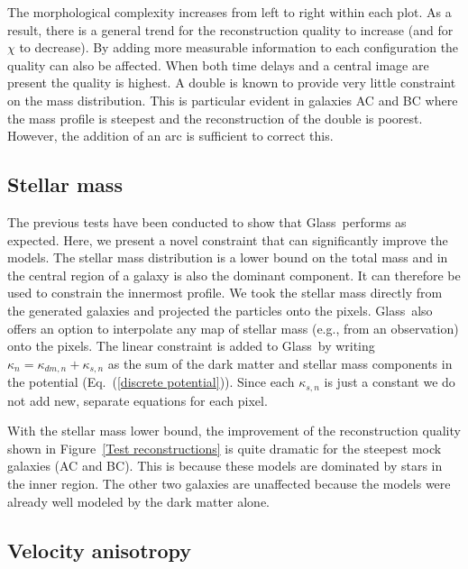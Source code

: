 \documentclass[onecolumn,galley]{mn2e}
\newcommand{\Glass}{{\sc Glass}}
\newcommand{\figref}[1] {Figure~\ref{#1}}
\newcommand{\eqnref}[1] {Eq.~(\ref{#1})}
\begin{document}
The morphological complexity increases from left to right within each plot. As
a result, there is a general trend for the reconstruction quality to increase
(and for $\chi$ to decrease). By adding more measurable information to each
configuration the quality can also be affected. When both time delays and a
central image are present the quality is highest. A double is known to provide
very little constraint on the mass distribution. This is particular evident in
galaxies AC and BC where the mass profile is steepest and the reconstruction of
the double is poorest. However, the addition of an arc is sufficient to correct
this.

\subsection{Stellar mass}

The previous tests have been conducted to show that \Glass\ performs as expected.
Here, we present a novel constraint that can significantly improve the models. 
The stellar mass distribution is a lower bound on the total mass and in the
central region of a galaxy is also the dominant component. It can therefore be
used to constrain the innermost profile. We took the stellar mass directly from
the generated galaxies and projected the particles onto the pixels. \Glass\
also offers an option to interpolate any map of stellar mass (e.g., from an
observation) onto the pixels. The linear constraint is added to \Glass\ by
writing $\kappa_n = \kappa_{dm,n} + \kappa_{s,n}$ as the sum of the
dark matter and stellar mass components in the potential (\eqnref{discrete
potential}). Since each $\kappa_{s,n}$ is just a constant we do not add new,
separate equations for each pixel. 

With the stellar mass lower bound, the improvement of the reconstruction
quality shown in \figref{Test reconstructions} is quite dramatic for the
steepest mock galaxies (AC and BC). This is because these models are dominated
by stars in the inner region. The other two galaxies are unaffected because the
models were already well modeled by the dark matter alone.

\subsection{Velocity anisotropy}
\end{document}
